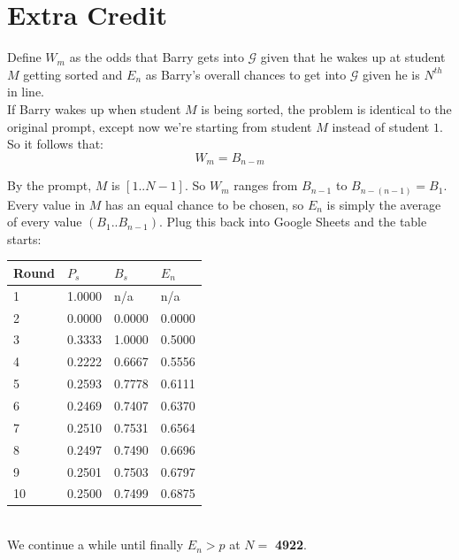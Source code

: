 \documentclass[10pt, letterpaper]{article}
\begin{document}
\section*{Extra Credit}

Define $W_m$ as the odds that Barry gets into $\mathcal{G}$ given that he wakes up at student $M$ getting sorted
and $E_n$ as Barry's overall chances to get into $\mathcal{G}$ given he is $N^{th}$ in line.\\

If Barry wakes up when student $M$ is being sorted, the problem is identical to the original prompt, except now we're starting from student $M$ instead of student $1$.
So it follows that:
\begin{equation}
    W_m = B_{n-m}
\end{equation}

By the prompt, $M$ is $[1..N-1]$. So $W_m$ ranges from $B_{n-1}$ to $B_{n-(n-1)} = B_1$.\\

Every value in $M$ has an equal chance to be chosen, so $E_n$ is simply the average of every value $(B_1..B_{n-1})$. Plug this back into Google Sheets and the table starts:\\

\begin{tabular}{l | l | l | l }
    Round   & $P_s$     & $B_s$     & $E_n$     \\ \hline
    1       & 1.0000    & n/a       & n/a       \\
    2       & 0.0000    & 0.0000    & 0.0000    \\
    3       & 0.3333    & 1.0000    & 0.5000    \\
    4       & 0.2222    & 0.6667    & 0.5556    \\
    5       & 0.2593    & 0.7778    & 0.6111    \\
    6       & 0.2469    & 0.7407    & 0.6370    \\
    7       & 0.2510    & 0.7531    & 0.6564    \\
    8       & 0.2497    & 0.7490    & 0.6696    \\
    9       & 0.2501    & 0.7503    & 0.6797    \\
    10      & 0.2500    & 0.7499    & 0.6875    \\
\end{tabular}\\

We continue a while until finally $E_n > p$ at $N = $ \textbf{4922}.
\end{document}
